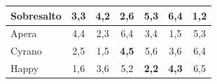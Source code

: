 \begin{enumerate}[label=(\alph*)]
\begin{table}[h]
\begin{tabular}{|l|c|c|c|c|c|c|}
            Sobresalto & 3,3       & 4,2       & 2,6      & 5,3      & 6,4        & {\bf1,2}  \\ \hline
            Apera      & 4,4       & 2,3       & 6,4      & 3,4      & 1,5        & 5,3       \\ \hline
            Cyrano     & 2,5       & 1,5       & {\bf4,5} & 5,6      & 3,6        & 6,4       \\ \hline
            Happy      & 1,6       & 3,6       & 5,2      & {\bf2,2} & {\bf4,3}   & 6,5       \\ \hline
            \end{tabular}
        \end{table}
    \end{enumerate}







